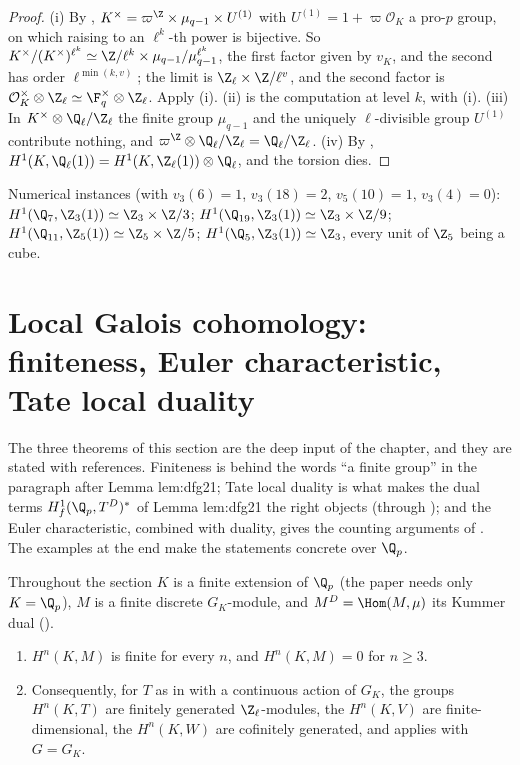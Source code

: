 \begin{proof}
(i) By , $K^\times=\varpi^{\Z}\times\mu_{q-1}\times U^{(1)}$ with $U^{(1)}=1+\varpi\mathcal O_K$ a pro-$p$ group, on which raising to an $\ell^k$-th power is
bijective. So $K^\times/(K^\times)^{\ell^k}\simeq\Z/\ell^k\times\mu_{q-1}/\mu_{q-1}^{\ell^k}$, the first factor given by $v_K$, and the second has order $\ell^{\min(k,v)}$; the limit
is $\Z_\ell\times\Z/\ell^v$, and the second factor is $\mathcal O_K^\times\otimes\Z_\ell\simeq\F_q^\times\otimes\Z_\ell$. Apply (i).
(ii) is the computation at level $k$, with (i). (iii) In $K^\times\otimes\Q_\ell/\Z_\ell$ the finite group $\mu_{q-1}$ and the uniquely $\ell$-divisible
group $U^{(1)}$ contribute nothing, and $\varpi^{\Z}\otimes\Q_\ell/\Z_\ell=\Q_\ell/\Z_\ell$. (iv) By , $H^1(K,\Q_\ell(1))=H^1(K,\Z_\ell(1))\otimes\Q_\ell$, and the
torsion dies.
\end{proof}

\noindent Numerical instances (with $v_3(6)=1$, $v_3(18)=2$, $v_5(10)=1$, $v_3(4)=0$): $H^1(\Q_7,\Z_3(1))\simeq\Z_3\times\Z/3$; $H^1(\Q_{19},\Z_3(1))\simeq\Z_3\times\Z/9$;
$H^1(\Q_{11},\Z_5(1))\simeq\Z_5\times\Z/5$; $H^1(\Q_5,\Z_3(1))\simeq\Z_3$, every unit of $\Z_5$ being a cube.
\section[Local Galois cohomology]{Local Galois cohomology: finiteness, Euler characteristic, Tate local duality}\label{sec:galcoh:local}

The three theorems of this section are the deep input of the chapter, and they are stated with references. Finiteness is behind the words ``a finite group''
in the paragraph after Lemma lem:dfg21; Tate local duality is what makes the dual terms $H^1_f(\Q_p,T^D)^*$ of Lemma lem:dfg21 the right objects (through
); and the Euler characteristic, combined with duality, gives the counting arguments of . The
examples at the end make the statements concrete over $\Q_p$.

Throughout the section $K$ is a finite extension of $\Q_p$ (the paper needs only $K=\Q_p$), $M$ is a finite discrete $G_K$-module, and $M^D=\Hom(M,\mu)$ its Kummer dual
().

\begin{theorem}\label{thm:galcoh:local-finiteness}
\begin{enumerate}[label=(\roman*)]
\item $H^n(K,M)$ is finite for every $n$, and $H^n(K,M)=0$ for $n\ge3$.
\item Consequently, for $T$ as in  with a continuous action of $G_K$, the groups $H^n(K,T)$ are finitely generated $\Z_\ell$-modules, the
$H^n(K,V)$ are finite-dimensional, the $H^n(K,W)$ are cofinitely generated, and  applies with $G=G_K$.
\end{enumerate}
\end{theorem}

